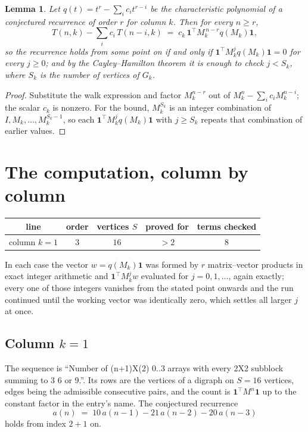 \documentclass[11pt,a4paper]{article}
\theoremstyle{plain}
\newtheorem{lemma}[theorem]{Lemma}
\theoremstyle{definition}
\begin{document}
\begin{lemma}\label{lem:crit}
Let $q(t)=t^{r}-\sum_i c_it^{r-i}$ be the characteristic polynomial of a conjectured
recurrence of order $r$ for column $k$. Then for every $n\ge r$,
\[
T(n,k)-\sum_i c_i\,T(n-i,k)\;=\;c_k\,\mathbf{1}^{\!\top}M_k^{\,n-r}q(M_k)\mathbf{1},
\]
so the recurrence holds from some point on if and only if
$\mathbf{1}^{\!\top}M_k^{j}q(M_k)\mathbf{1}=0$ for every $j\ge0$; and by the
Cayley--Hamilton theorem it is enough to check $j<S_k$, where $S_k$ is the number of vertices
of $G_k$.
\end{lemma}

\begin{proof}
Substitute the walk expression and factor $M_k^{n-r}$ out of $M_k^{n}-\sum_ic_iM_k^{n-i}$;
the scalar $c_k$ is nonzero. For the bound, $M_k^{S_k}$ is an integer combination of
$I,M_k,\dots,M_k^{S_k-1}$, so each $\mathbf{1}^{\!\top}M_k^{j}q(M_k)\mathbf{1}$ with
$j\ge S_k$ repeats that combination of earlier values.
\end{proof}

\section{The computation, column by column}

\begin{center}
\begin{tabular}{ccccc}
line & order & vertices $S$ & proved for & terms checked \\ \hline
column $k$$=1$ & $3$ & $16$ & $>2$ & $8$ \\
\end{tabular}
\end{center}

In each case the vector $w=q(M_k)\mathbf{1}$ was formed by $r$ matrix--vector products in
exact integer arithmetic and $\mathbf{1}^{\!\top}M_k^{j}w$ evaluated for $j=0,1,\dots$,
again exactly; every one of those integers vanishes from the stated point onwards and the run
continued until the working vector was identically zero, which settles all larger $j$ at once.

\subsection*{Column $k$$=1$}
The sequence is ``Number of (n+1)X(2) 0..3 arrays with every 2X2 subblock summing to 3 6 or 9.''. Its rows are the vertices of a digraph on
$S=16$ vertices, edges being the admissible consecutive pairs, and the count is
$\mathbf{1}^{\!\top}M^{n}\mathbf{1}$ up to the constant factor in the entry's name.
The conjectured recurrence
\[
a(n)\;=\;10\,a(n-1) - 21\,a(n-2) - 20\,a(n-3)
\]
holds from index $2+1$ on.
\end{document}
